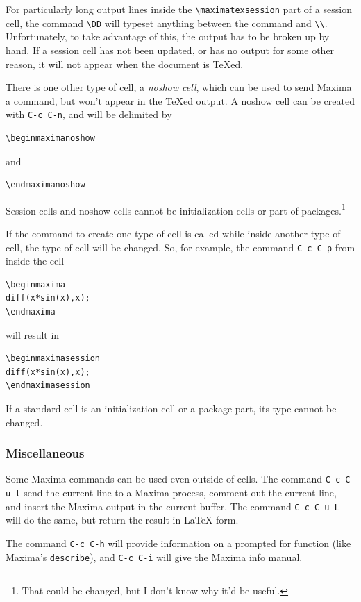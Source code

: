 For particularly long output lines inside the \verb+\maximatexsession+
part of a session cell, the command \verb+\DD+ will typeset anything
between the command and \verb+\\+.  Unfortunately, to take advantage
of this, the output has to be broken up by hand.
If a session cell has not been updated, or has no output for some
other reason, it will not appear when the document is \TeX{}ed.

There is one other type of cell, a \emph{noshow cell}, which can be
used to send Maxima a command, but won't appear in the \TeX{}ed
output. A noshow cell can be created with \texttt{C-c C-n}, and will
be delimited by
\begin{verbatim}
\beginmaximanoshow
\end{verbatim}
\noindent
and
\begin{verbatim}
\endmaximanoshow
\end{verbatim}

Session cells and noshow cells cannot be initialization cells or part of
packages.\footnote{That could be changed, but I don't know why it'd be
useful.} 

If the command to create one type of cell is called while inside
another type of cell, the type of cell will be changed.  So, for
example, the command \texttt{C-c C-p} from inside the cell
\begin{verbatim}
\beginmaxima
diff(x*sin(x),x);
\endmaxima
\end{verbatim}
\noindent
will result in
\begin{verbatim}
\beginmaximasession
diff(x*sin(x),x);
\endmaximasession
\end{verbatim}
\noindent
If a standard cell is an initialization cell or a package part, its
type cannot be changed.


\subsubsection{Miscellaneous}

\noindent
Some Maxima commands can be used even outside of cells.  The command 
\texttt{C-c C-u l} send the current line to a
Maxima process, comment out the current line, and insert the Maxima
output in the current buffer.  The command 
\texttt{C-c C-u L} will do the same, but
return the result in \LaTeX{} form.

The command \texttt{C-c C-h} will provide
information on a prompted for function (like Maxima's \texttt{describe}), 
and  \texttt{C-c C-i} will give the Maxima info manual.

